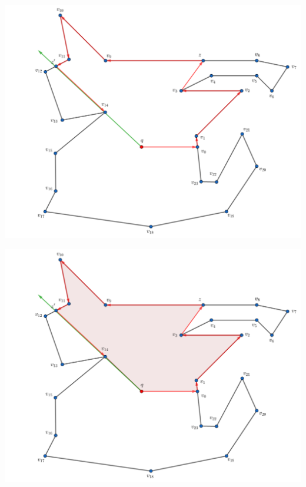 \begin{frame}
  \centering \includegraphics[width=0.70 \paperwidth]{images/Ejecucion/e18.png}
\end{frame}

\begin{frame}
  \centering \includegraphics[width=0.70 \paperwidth]{images/Ejecucion/e19.png}
\end{frame}

